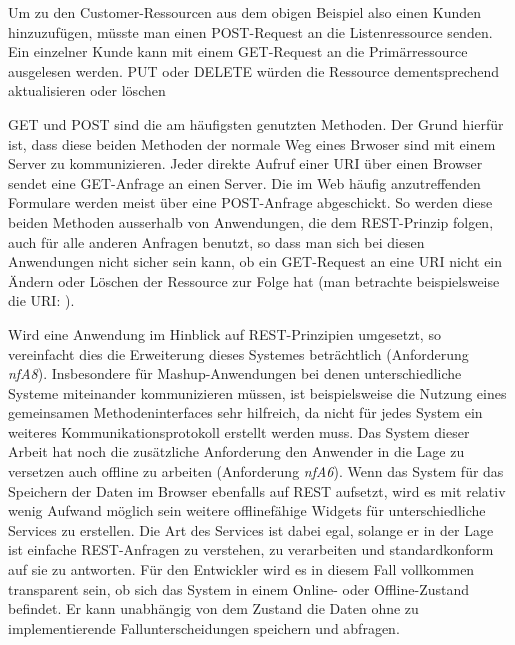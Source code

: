 Um zu den Customer-Ressourcen aus dem obigen Beispiel also einen Kunden hinzuzufügen, müsste man einen POST-Request an die Listenressource  senden. Ein einzelner Kunde kann mit einem GET-Request an die Primärressource  ausgelesen werden. PUT oder DELETE würden die Ressource dementsprechend aktualisieren oder löschen

GET und POST sind die am häufigsten genutzten Methoden. Der Grund hierfür ist, dass diese beiden Methoden der normale Weg eines Brwoser sind mit einem Server zu kommunizieren. Jeder direkte Aufruf einer URI über einen Browser sendet eine GET-Anfrage an einen Server. Die im Web häufig anzutreffenden Formulare werden meist über eine POST-Anfrage abgeschickt. So werden diese beiden Methoden ausserhalb von Anwendungen, die dem REST-Prinzip folgen, auch für alle anderen Anfragen benutzt, so dass man sich bei diesen Anwendungen nicht sicher sein kann, ob ein GET-Request an eine URI nicht ein Ändern oder Löschen der Ressource zur Folge hat (man betrachte beispielsweise die URI: ).

Wird eine Anwendung im Hinblick auf REST-Prinzipien umgesetzt, so vereinfacht dies die Erweiterung dieses Systemes beträchtlich (Anforderung \emph{nfA8}). Insbesondere für Mashup-Anwendungen bei denen unterschiedliche Systeme miteinander kommunizieren müssen, ist beispielsweise die Nutzung eines gemeinsamen Methodeninterfaces sehr hilfreich, da nicht für jedes System ein weiteres Kommunikationsprotokoll erstellt werden muss. Das System dieser Arbeit hat noch die zusätzliche Anforderung den Anwender in die Lage zu versetzen auch offline zu arbeiten (Anforderung \emph{nfA6}). Wenn das System für das Speichern der Daten im Browser ebenfalls auf REST aufsetzt, wird es mit relativ wenig Aufwand möglich sein weitere offlinefähige Widgets für unterschiedliche Services zu erstellen. Die Art des Services ist dabei egal, solange er in der Lage ist einfache REST-Anfragen zu verstehen, zu verarbeiten und standardkonform auf sie zu antworten. Für den Entwickler wird es in diesem Fall vollkommen transparent sein, ob sich das System in einem Online- oder Offline-Zustand befindet. Er kann unabhängig von dem Zustand die Daten ohne zu implementierende Fallunterscheidungen speichern und abfragen.

